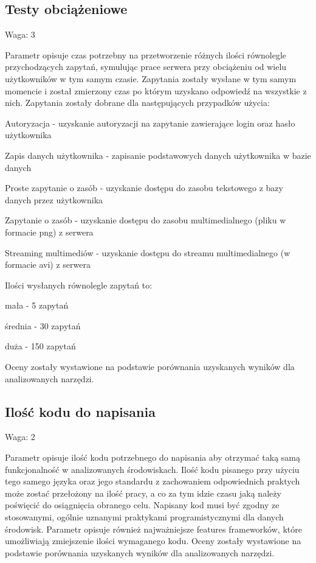 \documentclass[12pt]{report}
\begin{document}
    \subsection{Testy obciążeniowe}
      \begin{description}
        \item Waga: 3
      \end{description}
      Parametr opisuje czas potrzebny na przetworzenie różnych ilości równolegle przychodzących zapytań, symulując prace serwera przy obciążeniu od wielu użytkowników w tym samym czasie.
      Zapytania zostały wysłane w tym samym momencie i został zmierzony czas po którym uzyskano odpowiedź na wszystkie z nich.
      Zapytania zostały dobrane dla następujących przypadków użycia:
      \begin{description}
        \item Autoryzacja - uzyskanie autoryzacji na zapytanie zawierające login oraz hasło użytkownika
        \item Zapis danych użytkownika - zapisanie podstawowych danych użytkownika w bazie danych
        \item Proste zapytanie o zasób - uzyskanie dostępu do zasobu tekstowego z bazy danych przez użytkownika
        \item Zapytanie o zasób - uzyskanie dostępu do zasobu multimedialnego (pliku w formacie png) z serwera
        \item Streaming multimediów - uzyskanie dostępu do streamu multimedialnego (w formacie avi) z serwera
      \end{description}
      Ilości wysłanych równolegle zapytań to:
      \begin{description}
        \item mała - 5 zapytań
        \item średnia - 30 zapytań
        \item duża - 150 zapytań
      \end{description}
      Oceny zostały wystawione na podstawie porównania uzyskanych wyników dla analizowanych narzędzi.

    \subsection{Ilość kodu do napisania}
      \begin{description}
        \item Waga: 2
      \end{description}
      Parametr opisuje ilość kodu potrzebnego do napisania aby otrzymać taką samą funkcjonalność w analizowanych środowiskach.
      Ilość kodu pisanego przy użyciu tego samego języka oraz jego standardu z zachowaniem odpowiednich praktych może zostać przełożony na ilość pracy, a co za tym idzie czasu jaką należy poświęcić do osiągnięcia obranego celu.
      Napisany kod musi być zgodny ze stosowanymi, ogólnie uznanymi praktykami programistycznymi dla danych środowisk.
      Parametr opisuje również najważniejsze features frameworków, które umożliwiają zmiejszenie ilości wymaganego kodu.
      Oceny zostały wystawione na podstawie porównania uzyskanych wyników dla analizowanych narzędzi.
\end{document}
